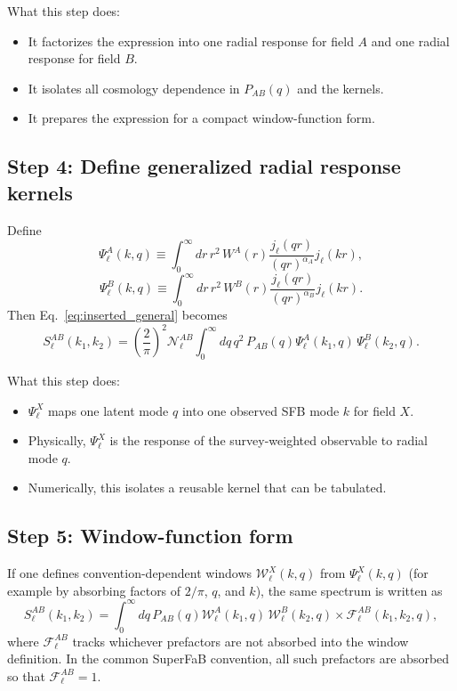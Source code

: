 What this step does:
\begin{itemize}
\item It factorizes the expression into one radial response for field $A$ and one
radial response for field $B$.
\item It isolates all cosmology dependence in $P_{AB}(q)$ and the kernels.
\item It prepares the expression for a compact window-function form.
\end{itemize}

\subsection{Step 4: Define generalized radial response kernels}

Define
\begin{equation}
\Psi_{\ell}^{A}(k,q)
\equiv \int_0^{\infty} dr\,r^2\,W^A(r)
\frac{j_\ell(qr)}{(qr)^{\alpha_A}}j_\ell(kr),
\label{eq:psi_A_general}
\end{equation}
\begin{equation}
\Psi_{\ell}^{B}(k,q)
\equiv \int_0^{\infty} dr\,r^2\,W^B(r)
\frac{j_\ell(qr)}{(qr)^{\alpha_B}}j_\ell(kr).
\label{eq:psi_B_general}
\end{equation}
Then Eq.~\eqref{eq:inserted_general} becomes
\begin{equation}
S_\ell^{AB}(k_1,k_2)
= \left(\frac{2}{\pi}\right)^2\mathcal N_\ell^{AB}
\int_0^{\infty} dq\,q^2\,P_{AB}(q)
\Psi_{\ell}^{A}(k_1,q)\,\Psi_{\ell}^{B}(k_2,q).
\label{eq:sfb_general_psi_form}
\end{equation}

What this step does:
\begin{itemize}
\item $\Psi_\ell^X$ maps one latent mode $q$ into one observed SFB mode $k$ for
field $X$.
\item Physically, $\Psi_\ell^X$ is the response of the survey-weighted observable
to radial mode $q$.
\item Numerically, this isolates a reusable kernel that can be tabulated.
\end{itemize}

\subsection{Step 5: Window-function form}

If one defines convention-dependent windows $\mathcal W_\ell^X(k,q)$ from
$\Psi_\ell^X(k,q)$ (for example by absorbing factors of $2/\pi$, $q$, and $k$),
the same spectrum is written as
\begin{equation}
S_\ell^{AB}(k_1,k_2)
= \int_0^{\infty} dq\,P_{AB}(q)
\mathcal W_\ell^A(k_1,q)\,\mathcal W_\ell^B(k_2,q)
\times \mathcal F_\ell^{AB}(k_1,k_2,q),
\label{eq:sfb_window_general}
\end{equation}
where $\mathcal F_\ell^{AB}$ tracks whichever prefactors are not absorbed into
the window definition. In the common SuperFaB convention, all such prefactors
are absorbed so that $\mathcal F_\ell^{AB}=1$.

